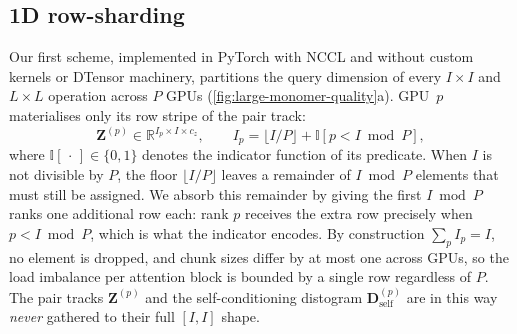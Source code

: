 \documentclass{article}
\theoremstyle{plain}
\theoremstyle{definition}
\theoremstyle{remark}
\begin{document}
\subsection{1D row-sharding}
\label{sec:1d}

Our first scheme, implemented in PyTorch with NCCL and without custom kernels or DTensor machinery, partitions the query dimension of every $I\times I$ and $L\times L$ operation across $P$ GPUs (\cref{fig:large-monomer-quality}a). GPU~$p$ materialises only its row stripe of the pair track:
\begin{equation}
\mathbf{Z}^{(p)} \in \mathbb{R}^{I_p \times I \times c_z}, \qquad
I_p = \lfloor I/P \rfloor + \mathbb{I}[p < I \bmod P],
\label{eq:stripe}
\end{equation}
where $\mathbb{I}[\,\cdot\,]\in\{0,1\}$ denotes the indicator function of its predicate. When $I$ is not divisible by $P$, the floor $\lfloor I/P\rfloor$ leaves a remainder of $I\bmod P$ elements that must still be assigned. We absorb this remainder by giving the first $I\bmod P$ ranks one additional row each: rank $p$ receives the extra row precisely when $p < I\bmod P$, which is what the indicator encodes. By construction $\sum_{p}I_p = I$, no element is dropped, and chunk sizes differ by at most one across GPUs, so the load imbalance per attention block is bounded by a single row regardless of $P$. The pair tracks $\mathbf{Z}^{(p)}$ and the self-conditioning distogram $\mathbf{D}^{(p)}_\text{self}$ are in this way \emph{never} gathered to their full $[I,I]$ shape.
\end{document}
